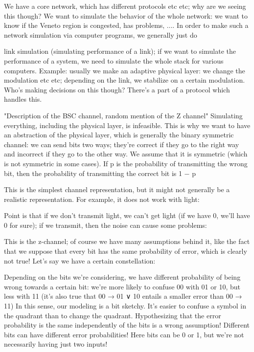 {{{We have a core network, which has different protocols etc etc; why are we seeing this though?
We want to simulate the behavior of the whole network: we want to know if the Veneto region is congested, has problems, ....
In order to make such a network simulation via computer programs, we generally just do

link simulation (simulating performance of a link); if we want to simulate the performance of a system, we need to simulate the whole stack for various computers.
Example: usually we make an adaptive physical layer: we change the modulation etc etc;
depending on the link, we stabilize on a certain modulation. Who's making decisions on this though? There's a part of a protocol which handles this.

"Description of the BSC channel, random mention of the Z channel"
Simulating everything, including the physical layer, is infeasible. This is why we want to have an abstraction of the physical layer, which is generally the binary symmetric channel: we can send bits two ways; they're correct if they go to the right way and incorrect if they go to the other way.
We assume that it is symmetric (which is not symmetric in some cases).
If p is the probability of transmitting the wrong bit, then the probability of transmitting the correct bit is 1 − p

This is the simplest channel representation, but it might not generally be a realistic representation.
For example, it does not work with light:

Point is that if we don't transmit light, we can't get light (if we have 0, we'll have 0 for sure); if we transmit, then the noise can cause some problems:

This is the z-channel; of course we have many assumptions behind it, like the fact that we suppose that every bit has the same probability of error, which is clearly not true!
Let's say we have a certain constellation:

Depending on the bits we're considering, we have different probability of being wrong towards a certain bit: we're more likely to confuse 00 with 01 or 10, but less with 11
(it's also true that 00 → 01 ∨ 10 entails a smaller error than 00 → 11)
In this sense, our modeling is a bit sketchy.
It's easier to confuse a symbol in the quadrant than to change the quadrant.
Hypothesizing that the error probability is the same independently of the bits is a wrong assumption! Different bits can have different error probabilities!
Here bits can be 0 or 1, but we're not necessarily having just two inputs!

}}}
